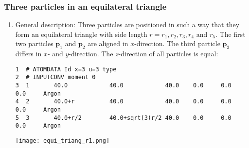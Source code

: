 \documentclass[a4paper]{article}
\newcommand{\boldp}{\boldsymbol{p}}
\begin{document}
\subsubsection{Three particles in an equilateral triangle}
\label{sec-1-5-1}
\begin{enumerate}
\item General description:
\label{sec-1-5-1-1}
Three particles are positioned in such a way that they form an equilateral triangle with side length \(r = r_1, r_2, r_3, r_4\) and \(r_5\).
The first two particles \(\boldp_1\) and \(\boldp_2\) are aligned in \(x\)-direction. The third particle \(\boldp_3\) differs in \(x\)- and \(y\)-direction.
The \(z\)-direction of all particles is equal:
\begin{verbatim}
1  # ATOMDATA Id x=3 u=3 type
2  # INPUTCONV moment 0
3  1       40.0            40.0            40.0    0.0     0.0     0.0     Argon
4  2       40.0+r          40.0            40.0    0.0     0.0     0.0     Argon
5  3       40.0+r/2        40.0+sqrt(3)r/2 40.0    0.0     0.0     0.0     Argon
\end{verbatim}

\texttt{[image: equi\_triang\_r1.png]}


\end{enumerate}
\end{document}
